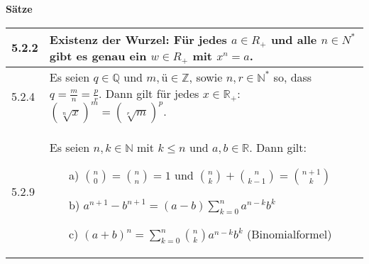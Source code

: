     \noindent
    \textbf{Sätze}
    \begin{table}[H]
    \begin{tabularx}{\textwidth}{X m{16cm}}
        \toprule

        5.2.2 & \textbf{Existenz der Wurzel:} \hfill \break 
                Für jedes $a \in R_+$ und alle $n \in N^*$ gibt es genau ein $w \in R_+$ mit $x^n = a$. \\
        \midrule
        5.2.4 & Es seien $q \in \mathbb{Q}$ und $m,ü \in \mathbb{Z}$, sowie $n,r \in \mathbb{N^*}$ so, dass
                $q = \frac{m}{n} = \frac{p}{r}$. \hfill \break
                Dann gilt für jedes $x \in \mathbb{R_+}$: $(\sqrt[n]{x})^m = (\sqrt[r]{m})^p$. \\
        \midrule
        5.2.9 & Es seien $n,k \in \mathbb{N}$ mit $k \leq n$ und $a,b \in \mathbb{R}$. Dann gilt:
                \begin{itemize}[topsep=-0.5cm]
                    \item[a)] $\binom{n}{0} = \binom{n}{n} = 1$ und $\binom{n}{k} + \binom{n}{k-1} = \binom{n+1}{k}$
                    \item[b)] $a^{n+1} - b^{n+1} = (a-b) \sum^n_{k=0}a^{n-k}b^k$
                    \item[c)] $(a+b)^n = \sum^n_{k=0} \binom{n}{k} a^{n-k}b^k$ (Binomialformel)  
                \end{itemize} \vspace{-0cm} \\
        

        \bottomrule
    \end{tabularx}
    \end{table}

